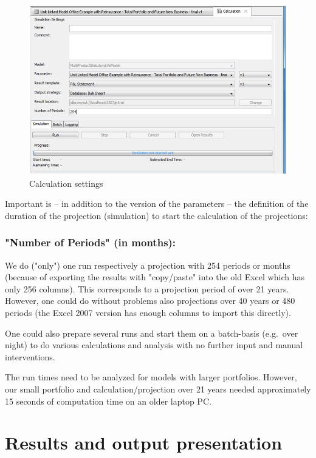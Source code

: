 \begin{figure}
\includegraphics[scale=0.7]{images/lifecalculation.png}
	\caption{Calculation settings}
	\label{fig:lifecalculation}
\end{figure}

Important is -- in addition to the version of the parameters -- the definition of the duration of the projection (simulation) to start the calculation of the projections:

\subsubsection{"Number of Periods" (in months):}
We do ("only") one run respectively a projection with 254 periods or months (because of exporting the results with "copy/paste" into the old Excel which has only 256 columns). This corresponds to a projection period of over 21 years. However, one could do without problems also projections over 40 years or 480 periods (the Excel 2007 version has enough columns to import this directly).

One could also prepare several runs and start them on a batch-basis (e.g.~over night) to do various calculations and analysis with no further input and manual interventions.

The run times need to be analyzed for models with larger portfolios. However, our small portfolio and calculation/projection over 21 years needed approximately 15 seconds of computation time on an older laptop PC.


\section{Results and output presentation}

